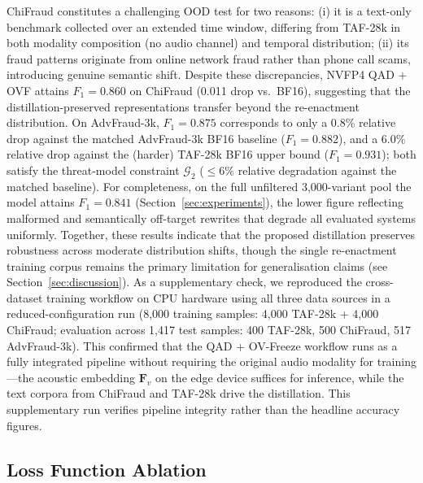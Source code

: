 \documentclass[final,5p,times,number]{elsarticle}
\begin{document}
ChiFraud constitutes a challenging OOD test for two reasons: (i) it is a text-only benchmark collected over an extended time window, differing from TAF-28k in both modality composition (no audio channel) and temporal distribution; (ii) its fraud patterns originate from online network fraud rather than phone call scams, introducing genuine semantic shift. Despite these discrepancies, NVFP4 QAD + OVF attains $F_1 = 0.860$ on ChiFraud (0.011 drop vs.\ BF16), suggesting that the distillation-preserved representations transfer beyond the re-enactment distribution. On AdvFraud-3k, $F_1 = 0.875$ corresponds to only a 0.8\% relative drop against the matched AdvFraud-3k BF16 baseline ($F_1=0.882$), and a 6.0\% relative drop against the (harder) TAF-28k BF16 upper bound ($F_1=0.931$); both satisfy the threat-model constraint $\mathcal{G}_2$ ($\le 6\%$ relative degradation against the matched baseline). For completeness, on the full unfiltered 3{,}000-variant pool the model attains $F_1 = 0.841$ (Section~\ref{sec:experiments}), the lower figure reflecting malformed and semantically off-target rewrites that degrade all evaluated systems uniformly. Together, these results indicate that the proposed distillation preserves robustness across moderate distribution shifts, though the single re-enactment training corpus remains the primary limitation for generalisation claims (see Section~\ref{sec:discussion}). As a supplementary check, we reproduced the cross-dataset training workflow on CPU hardware using all three data sources in a reduced-configuration run (8{,}000 training samples: 4{,}000 TAF-28k + 4{,}000 ChiFraud; evaluation across 1{,}417 test samples: 400 TAF-28k, 500 ChiFraud, 517 AdvFraud-3k). This confirmed that the QAD + OV-Freeze workflow runs as a fully integrated pipeline without requiring the original audio modality for training---the acoustic embedding $\bm{F}_v$ on the edge device suffices for inference, while the text corpora from ChiFraud and TAF-28k drive the distillation. This supplementary run verifies pipeline integrity rather than the headline accuracy figures.

\subsection{Loss Function Ablation}\label{sec:loss-ablation}
\end{document}
